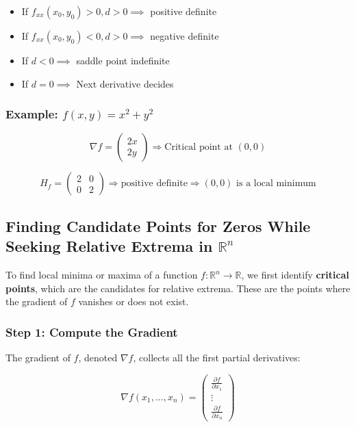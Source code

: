 \begin{itemize}[label=\(-\)]
    \item If \(f_{xx}(x_0, y_0) > 0, d > 0 \implies\) positive definite
    \item If \(f_{xx}(x_0, y_0) < 0, d > 0 \implies\) negative definite
    \item If \(d < 0 \implies \) saddle point indefinite
    \item If \(d = 0 \implies \) Next derivative decides
\end{itemize}

\subsubsection*{Example: \( f(x, y) = x^2 + y^2 \)}

\[
\nabla f = \begin{pmatrix} 2x \\ 2y \end{pmatrix} \Rightarrow \text{Critical point at } (0, 0)
\]

\[
H_f = \begin{pmatrix} 2 & 0 \\ 0 & 2 \end{pmatrix} \Rightarrow \text{positive definite}
\Rightarrow (0, 0) \text{ is a local minimum}
\]

\subsection{Finding Candidate Points for Zeros While Seeking Relative Extrema in \( \mathbb{R}^n \)}

To find local minima or maxima of a function \( f : \mathbb{R}^n \to \mathbb{R} \), we first identify \textbf{critical points}, which are the candidates for relative extrema. These are the points where the gradient of \( f \) vanishes or does not exist.

\subsubsection{Step 1: Compute the Gradient}

The gradient of \( f \), denoted \( \nabla f \), collects all the first partial derivatives:

\[
\nabla f(x_1, \dots, x_n) =
\begin{pmatrix}
\frac{\partial f}{\partial x_1} \\
\vdots \\
\frac{\partial f}{\partial x_n}
\end{pmatrix}
\]

